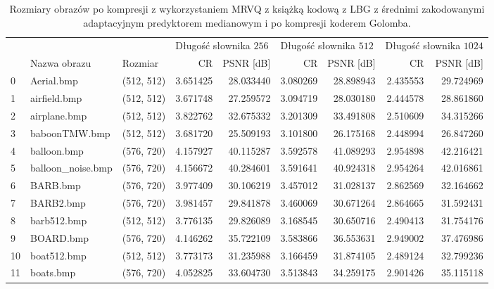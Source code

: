 \documentclass{article}
\begin{document}
\begin{table}[H]
  \caption{Rozmiary obrazów po kompresji z wykorzystaniem MRVQ z książką kodową z LBG z średnimi zakodowanymi adaptacyjnym predyktorem medianowym i po kompresji koderem Golomba.}
  \label{tab:compression}
  \centering
\begin{adjustbox}{center}
    \begin{tabular}{lllrrrrrr}
    \toprule
        {} & {} & {} & \multicolumn{2}{l}{Długość słownika $256$} & \multicolumn{2}{l}{Długość słownika $512$} & \multicolumn{2}{l}{Długość słownika $1024$} \\
        {} &               Nazwa obrazu &        Rozmiar &    CR &   PSNR [dB] &    CR &   PSNR [dB] &   CR &  PSNR [dB] \\
    \midrule
    0  &         Aerial.bmp &  (512, 512) &  3.651425 &  28.033440 &  3.080269 &  28.898943 &  2.435553 &  29.724969 \\
    1  &       airfield.bmp &  (512, 512) &  3.671748 &  27.259572 &  3.094719 &  28.030180 &  2.444578 &  28.861860 \\
    2  &       airplane.bmp &  (512, 512) &  3.822762 &  32.675332 &  3.201309 &  33.491808 &  2.510609 &  34.315266 \\
    3  &      baboonTMW.bmp &  (512, 512) &  3.681720 &  25.509193 &  3.101800 &  26.175168 &  2.448994 &  26.847260 \\
    4  &        balloon.bmp &  (576, 720) &  4.157927 &  40.115287 &  3.592578 &  41.089293 &  2.954898 &  42.216421 \\
    5  &  balloon\_noise.bmp &  (576, 720) &  4.156672 &  40.284601 &  3.591641 &  40.924318 &  2.954264 &  42.016861 \\
    6  &           BARB.bmp &  (576, 720) &  3.977409 &  30.106219 &  3.457012 &  31.028137 &  2.862569 &  32.164662 \\
    7  &          BARB2.bmp &  (576, 720) &  3.981457 &  29.841878 &  3.460069 &  30.671264 &  2.864665 &  31.592431 \\
    8  &        barb512.bmp &  (512, 512) &  3.776135 &  29.826089 &  3.168545 &  30.650716 &  2.490413 &  31.754176 \\
    9  &          BOARD.bmp &  (576, 720) &  4.146262 &  35.722109 &  3.583866 &  36.553631 &  2.949002 &  37.476986 \\
    10 &        boat512.bmp &  (512, 512) &  3.773173 &  31.235988 &  3.166459 &  31.874105 &  2.489124 &  32.799236 \\
    11 &          boats.bmp &  (576, 720) &  4.052825 &  33.604730 &  3.513843 &  34.259175 &  2.901426 &  35.115118 \\

\end{tabular}
\end{adjustbox}
\end{table}
\end{document}
